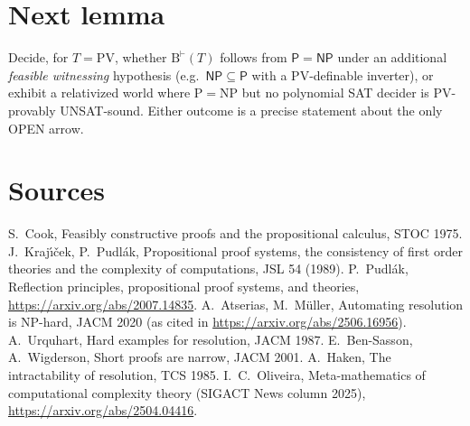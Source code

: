 \documentclass[11pt]{article}
\theoremstyle{definition}
\begin{document}
\section*{Next lemma}
Decide, for $T=\mathrm{PV}$, whether $\mathrm B^{\vdash}(T)$ follows from
$\mathsf P=\mathsf{NP}$ under an additional \emph{feasible witnessing} hypothesis
(e.g.\ $\mathsf{NP}\subseteq\mathsf P$ with a PV-definable inverter), or exhibit a
relativized world where P$=$NP but no polynomial SAT decider is PV-provably
UNSAT-sound. Either outcome is a precise statement about the only OPEN arrow.

\section*{Sources}
S.~Cook, Feasibly constructive proofs and the propositional calculus, STOC 1975.
J.~Kraj\'{\i}\v{c}ek, P.~Pudl\'ak, Propositional proof systems, the consistency of
first order theories and the complexity of computations, JSL 54 (1989).
P.~Pudl\'ak, Reflection principles, propositional proof systems, and theories,
\url{https://arxiv.org/abs/2007.14835}.
A.~Atserias, M.~M\"uller, Automating resolution is NP-hard, JACM 2020
(as cited in \url{https://arxiv.org/abs/2506.16956}).
A.~Urquhart, Hard examples for resolution, JACM 1987.
E.~Ben-Sasson, A.~Wigderson, Short proofs are narrow, JACM 2001.
A.~Haken, The intractability of resolution, TCS 1985.
I.~C.~Oliveira, Meta-mathematics of computational complexity theory (SIGACT News
column 2025), \url{https://arxiv.org/abs/2504.04416}.
\end{document}
